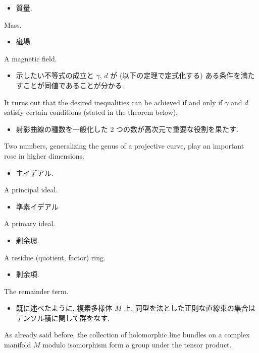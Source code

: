 \documentclass[openany, a4paper, oneside]{jsbook}
\begin{document}
\begin{itemize}
\item 質量.
\end{itemize}
Mass.

\begin{itemize}
\item 磁場.
\end{itemize}
A magnetic field.

\begin{itemize}
\item 示したい不等式の成立と $\gamma$, $d$ が (以下の定理で定式化する) ある条件を満たすことが同値であることが分かる. \cite{LiebSeiringer1}
\end{itemize}
It turns out that the desired inequalities can be achieved if and only if
$\gamma$ and $d$ satisfy certain conditions (stated in the theorem below).

\begin{itemize}
\item 射影曲線の種数を一般化した 2 つの数が高次元で重要な役割を果たす. \cite{ChrisPeters1}
\end{itemize}
Two numbers, generalizing the genus of a projective curve, play
an important rose in higher dimensions.

\begin{itemize}
\item 主イデアル.
\end{itemize}
A principal ideal.

\begin{itemize}
\item 準素イデアル
\end{itemize}
A primary ideal.

\begin{itemize}
\item 剰余環.
\end{itemize}
A residue (quotient, factor) ring.

\begin{itemize}
\item 剰余項.
\end{itemize}
The remainder term.

\begin{itemize}
\item 既に述べたように, 複素多様体 $M$ 上, 同型を法とした正則な直線束の集合はテンソル積に関して群をなす. \cite{ChrisPeters1}
\end{itemize}
As already said before, the collection of holomorphic line bundles on a complex manifold
$M$ modulo isomorphism form a group under the tensor product.
\end{document}
